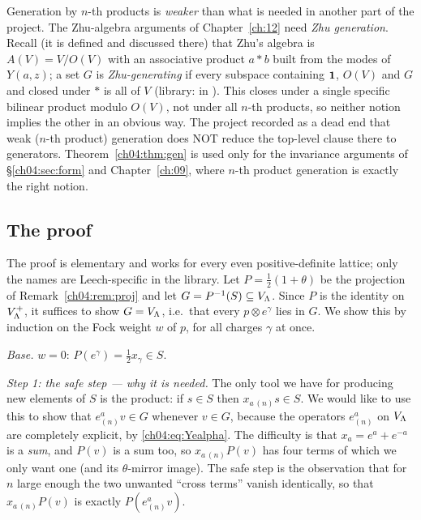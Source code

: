 \begin{warning}
Generation by $n$-th products is \emph{weaker} than what is needed in another part of the project.
The Zhu-algebra arguments of Chapter~\ref{ch:12} need \emph{Zhu generation}. Recall (it is
defined and discussed there) that Zhu's algebra is $A(V)=V/O(V)$ with an associative product $a*b$
built from the modes of $Y(a,z)$; a set $G$ is \emph{Zhu-generating} if every subspace containing
$\mathbf{1}$, $O(V)$ and $G$ and closed under $*$ is all of $V$ (library:  in
). This closes under a single specific bilinear product
modulo $O(V)$, not under all $n$-th products, so neither notion implies the other in an obvious way.
The project recorded as a dead end that weak ($n$-th product) generation does NOT
reduce the top-level clause there to generators. Theorem~\ref{ch04:thm:gen} is used only for the
invariance arguments of \S\ref{ch04:sec:form} and Chapter~\ref{ch:09}, where $n$-th product
generation is exactly the right notion.
\end{warning}

\subsection{The proof}

The proof is elementary and works for every even positive-definite lattice; only the names are
Leech-specific in the library. Let $P=\tfrac12(1+\theta)$ be the projection of
Remark~\ref{ch04:rem:proj} and let $G=P^{-1}(S)\subseteq V_{\Lambda}$. Since $P$ is the identity on
$V_{\Lambda}^+$, it suffices to show $G=V_{\Lambda}$, i.e.\ that every $p\otimes e^\gamma$ lies in $G$. We
show this by induction on the Fock weight $w$ of $p$, for all charges $\gamma$ at once.

\emph{Base.} $w=0$: $P(e^\gamma)=\tfrac12x_\gamma\in S$.

\emph{Step 1: the safe step --- why it is needed.} The only tool we have for producing new
elements of $S$ is the product: if $s\in S$ then $x_{a\,(n)}s\in S$. We would like to use this to
show that $e^a_{(n)}v\in G$ whenever $v\in G$, because the operators $e^a_{(n)}$ on $V_{\Lambda}$ are
completely explicit, by \eqref{ch04:eq:Yealpha}. The difficulty is that $x_a=e^a+e^{-a}$ is a
\emph{sum}, and $P(v)$ is a sum too, so $x_{a\,(n)}P(v)$ has four terms of which we only want one
(and its $\theta$-mirror image). The safe step is the observation that for $n$ large enough the
two unwanted ``cross terms'' vanish identically, so that $x_{a\,(n)}P(v)$ is exactly $P(e^a_{(n)}v)$.

